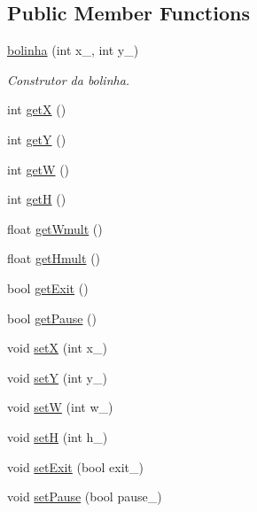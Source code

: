 \subsection*{Public Member Functions}
\begin{DoxyCompactItemize}
\item 
\hyperlink{classbolinha_a157417fa65cf082083216e56ddab736a}{bolinha} (int x\+\_\+, int y\+\_\+)
\begin{DoxyCompactList}\small\item\em Construtor da bolinha. \end{DoxyCompactList}\item 
int \hyperlink{classbolinha_a16bfb1ab48a09a3dd5cf5868cb2f475d}{getX} ()
\item 
int \hyperlink{classbolinha_a143dbe11a42e1fcdccb1f19d4d9f715e}{getY} ()
\item 
int \hyperlink{classbolinha_ab5cbca5168da5df74705fea330490382}{getW} ()
\item 
int \hyperlink{classbolinha_ae6c9c0d7b5770ca865e1bd5cc1f773f4}{getH} ()
\item 
float \hyperlink{classbolinha_a90342ef3d458c503db81dd80c53ffa05}{get\+Wmult} ()
\item 
float \hyperlink{classbolinha_ac485ff1907f1416a42511d0d333eef59}{get\+Hmult} ()
\item 
bool \hyperlink{classbolinha_a87e092bdaa996f8c08236d3e3aa4c605}{get\+Exit} ()
\item 
bool \hyperlink{classbolinha_a416b5ee9e822606a0cc414f384619000}{get\+Pause} ()
\item 
void \hyperlink{classbolinha_aa96439a9d3655912359a58a2096f8adc}{setX} (int x\+\_\+)
\item 
void \hyperlink{classbolinha_a28c1acdaebe902ba404ac6873800d8bf}{setY} (int y\+\_\+)
\item 
void \hyperlink{classbolinha_a67d6d1e736779f2bbc845860103cc8fc}{setW} (int w\+\_\+)
\item 
void \hyperlink{classbolinha_ac77f2965fe5b0fab4879d5eeb89b1560}{setH} (int h\+\_\+)
\item 
void \hyperlink{classbolinha_a69c7848b06c9436027e3e1d117b03b26}{set\+Exit} (bool exit\+\_\+)
\item 
void \hyperlink{classbolinha_af223163ae42634912c3e4cba05e48acd}{set\+Pause} (bool pause\+\_\+)
\end{DoxyCompactItemize}
